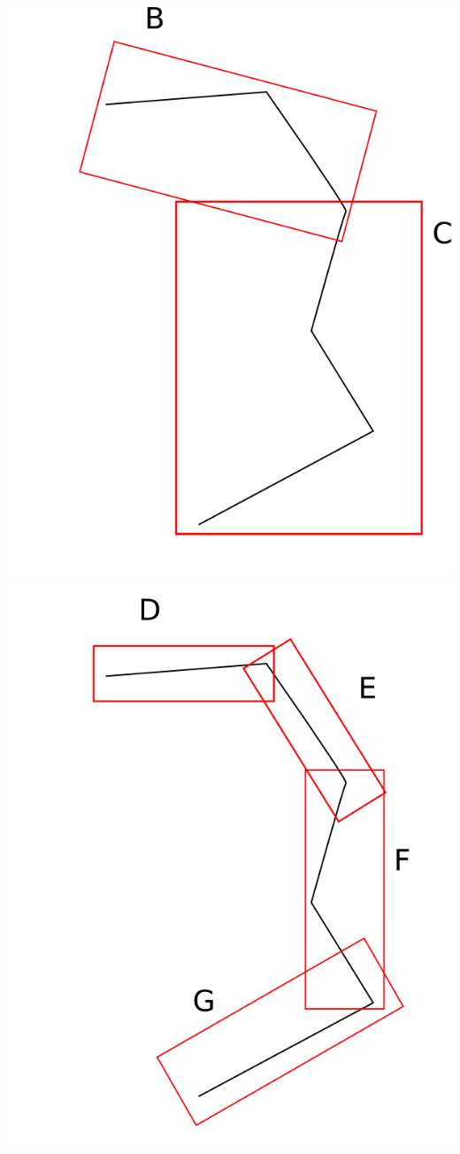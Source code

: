\documentclass[14pt]{beamer}
\begin{document}
\begin{frame}
\begin{center}
\includegraphics[scale=0.18]{OBB_BC.png}
\includegraphics[scale=0.18]{OBB_DEFG.png} \\
\end{center}

\end{frame}
\end{document}
